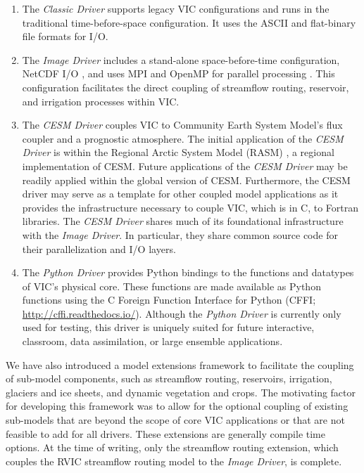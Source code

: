 \documentclass[gmd, manuscript]{copernicus}
\begin{document}
  \begin{enumerate}
    \item  The \textit{Classic Driver} supports legacy VIC configurations and runs in the traditional time-before-space configuration. It uses the ASCII and flat-binary file formats for I/O.

    \item The \textit{Image Driver} includes a stand-alone space-before-time configuration, NetCDF I/O \citep{Rew_1990}, and uses MPI and OpenMP for parallel processing \citep{Gropp_1996}. This configuration facilitates the direct coupling of streamflow routing, reservoir, and irrigation processes within VIC.

    \item The \textit{CESM Driver} couples VIC to Community Earth System Model's \citep[CESM;][]{Hurrell_2013} flux coupler \citep[CPL7;][]{Craig_2012} and a prognostic atmosphere. The initial application of the \textit{CESM Driver} is within the Regional Arctic System Model (RASM) \citep{Hamman_2016a}, a regional implementation of CESM. Future applications of the \textit{CESM Driver} may be readily applied within the global version of CESM. Furthermore, the CESM driver may serve as a template for other coupled model applications as it provides the infrastructure necessary to couple VIC, which is in C, to Fortran libraries. The \textit{CESM Driver} shares much of its foundational infrastructure with the \textit{Image Driver}. In particular, they share common source code for their parallelization and I/O layers.

    \item The \textit{Python Driver} provides Python bindings to the functions and datatypes of VIC’s physical core. These functions are made available as Python functions using the C Foreign Function Interface for Python (CFFI; \url{http://cffi.readthedocs.io/}). Although the \textit{Python Driver} is currently only used for testing, this driver is uniquely suited for future interactive, classroom, data assimilation, or large ensemble applications.

  \end{enumerate}

  We have also introduced a model extensions framework to facilitate the coupling of sub-model components, such as streamflow routing, reservoirs, irrigation, glaciers and ice sheets, and dynamic vegetation and crops. The motivating factor for developing this framework was to allow for the optional coupling of existing sub-models that are beyond the scope of core VIC applications or that are not feasible to add for all drivers. These extensions are generally compile time options. At the time of writing, only the streamflow routing extension, which couples the RVIC streamflow routing model \citep{Hamman_2017a} to the \textit{Image Driver}, is complete.
\end{document}
